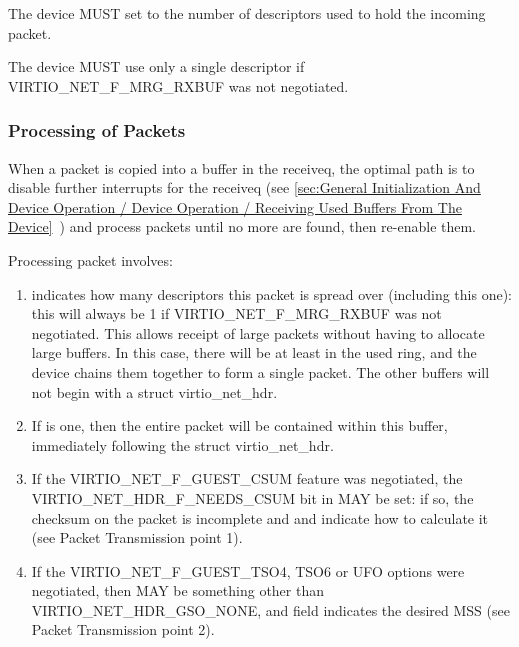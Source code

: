 
The device MUST set  to the number of descriptors used to
hold the incoming packet.

The device MUST use only a single descriptor if VIRTIO_NET_F_MRG_RXBUF
was not negotiated. 

\subsubsection{Processing of Packets}\label{sec:Device Types / Network Device / Device Operation / Processing of Packets}

When a packet is copied into a buffer in the receiveq, the
optimal path is to disable further interrupts for the receiveq
(see \ref{sec:General Initialization And Device Operation / Device Operation / Receiving Used Buffers From The Device}~) and process
packets until no more are found, then re-enable them.

Processing packet involves:

\begin{enumerate}
\item {} indicates how many descriptors
  this packet is spread over (including this one): this will
  always be 1 if VIRTIO_NET_F_MRG_RXBUF was not negotiated.
  This allows receipt of large packets without having to allocate large
  buffers. In this case, there will be at least  in
  the used ring, and the device chains them together to form a
  single packet. The other buffers will not begin with a struct
  virtio_net_hdr.

\item If
   is one, then the entire packet will be
  contained within this buffer, immediately following the struct
  virtio_net_hdr.

\item If the VIRTIO_NET_F_GUEST_CSUM feature was negotiated, the
  VIRTIO_NET_HDR_F_NEEDS_CSUM bit in  MAY be
  set: if so, the checksum on the packet is incomplete and
   and  indicate how to calculate
  it (see Packet Transmission point 1).

\item If the VIRTIO_NET_F_GUEST_TSO4, TSO6 or UFO options were
  negotiated, then  MAY be something other than
  VIRTIO_NET_HDR_GSO_NONE, and  field indicates the
  desired MSS (see Packet Transmission point 2).
\end{enumerate}

